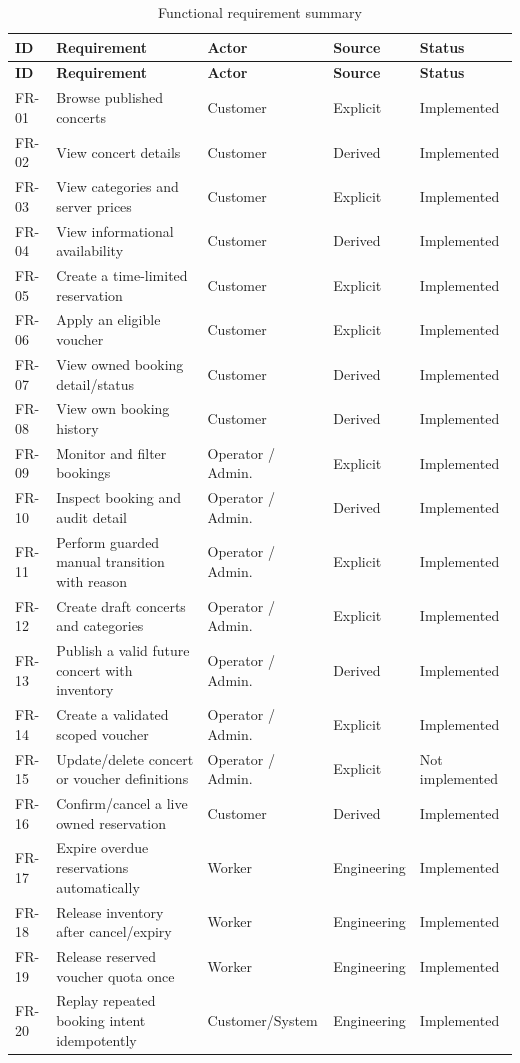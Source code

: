\begingroup
\setlength{\tabcolsep}{3pt}
\scriptsize
\begin{longtable}{p{}p{}p{}p{}p{}}
\caption{Functional requirement summary}\label{tab:functional-requirements}\\
\toprule
\textbf{ID} & \textbf{Requirement} & \textbf{Actor} & \textbf{Source} & \textbf{Status} \\
\midrule
\endfirsthead
\toprule
\textbf{ID} & \textbf{Requirement} & \textbf{Actor} & \textbf{Source} & \textbf{Status} \\
\midrule
\endhead
FR-01 & Browse published concerts & Customer & Explicit & Implemented \\
FR-02 & View concert details & Customer & Derived & Implemented \\
FR-03 & View categories and server prices & Customer & Explicit & Implemented \\
FR-04 & View informational availability & Customer & Derived & Implemented \\
FR-05 & Create a time-limited reservation & Customer & Explicit & Implemented \\
FR-06 & Apply an eligible voucher & Customer & Explicit & Implemented \\
FR-07 & View owned booking detail/status & Customer & Derived & Implemented \\
FR-08 & View own booking history & Customer & Derived & Implemented \\
FR-09 & Monitor and filter bookings & Operator / Admin. & Explicit & Implemented \\
FR-10 & Inspect booking and audit detail & Operator / Admin. & Derived & Implemented \\
FR-11 & Perform guarded manual transition with reason & Operator / Admin. & Explicit & Implemented \\
FR-12 & Create draft concerts and categories & Operator / Admin. & Explicit & Implemented \\
FR-13 & Publish a valid future concert with inventory & Operator / Admin. & Derived & Implemented \\
FR-14 & Create a validated scoped voucher & Operator / Admin. & Explicit & Implemented \\
FR-15 & Update/delete concert or voucher definitions & Operator / Admin. & Explicit & Not implemented \\
FR-16 & Confirm/cancel a live owned reservation & Customer & Derived & Implemented \\
FR-17 & Expire overdue reservations automatically & Worker & Engineering & Implemented \\
FR-18 & Release inventory after cancel/expiry & Worker & Engineering & Implemented \\
FR-19 & Release reserved voucher quota once & Worker & Engineering & Implemented \\
FR-20 & Replay repeated booking intent idempotently & Customer/System & Engineering & Implemented \\
\bottomrule
\end{longtable}
\endgroup

